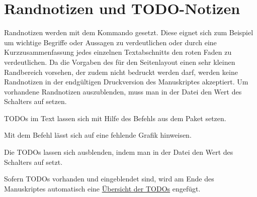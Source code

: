\section{Randnotizen und TODO-Notizen}%
%
%
\label{sec:Randnotizen}
%
Randnotizen 
%
werden mit dem Kommando  gesetzt.
Diese eignet sich zum Beispiel um wichtige Begriffe oder Aussagen zu verdeutlichen
oder durch eine Kurzzusammenfassung jedes einzelnen Textabschnitts
den roten Faden zu verdeutlichen.
Da die Vorgaben des  für den Seitenlayout einen sehr kleinen Randbereich vorsehen, der zudem nicht bedruckt werden darf,
werden keine Randnotizen in der endgültigen Druckversion des Manuskriptes akzeptiert.
Um \ggf vorhandene Randnotizen auszublenden,
muss man in der Datei  den Wert des Schalters
 auf  setzen.

TODOs im Text lassen sich mit Hilfe des Befehls  aus dem Paket  setzen.

Mit dem Befehl  lässt sich auf eine fehlende Grafik hinweisen.

Die TODOs lassen sich ausblenden, indem man in der Datei  den Wert des Schalters
 auf  setzt.

Sofern TODOs vorhanden und eingeblendet sind, wird am Ende des Manuskriptes automatisch eine \hyperlink{TODO-List}{Übersicht der TODOs} engefügt.